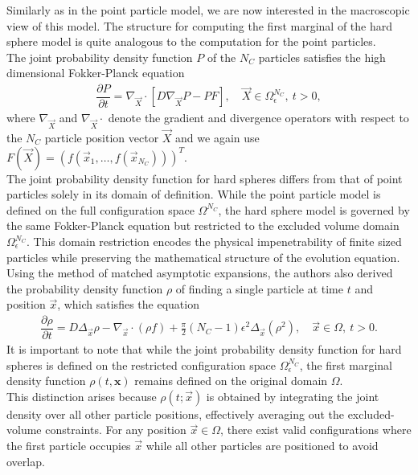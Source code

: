 Similarly as in the point particle model, we are now interested in the macroscopic view of this model. 
The structure for computing the first marginal of the hard sphere model is quite analogous to the computation for the point particles. \\
The joint probability density function $P$ of the $N_C$ particles satisfies the high dimensional Fokker-Planck equation
\begin{align*}
	\dfrac{\partial P}{\partial t} = \nabla_{\vec{X}} \cdot [ D \nabla_{\vec{X}} P - P F], \quad \vec{X} \in \Omega_{\epsilon}^{N_C}, \: t > 0,
\end{align*}
where $\nabla_{\vec{X}}$ and $\nabla_{\vec{X}} \cdot$ denote the gradient and divergence operators with respect to the $N_C$ particle position vector $\vec{X}$ and we again use $F(\vec{X}) = (f(\vec{x}_1, \ldots, f(\vec{x}_{N_C})))^T$. \\
The joint probability density function for hard spheres differs from that of point particles solely in its domain of definition. 
While the point particle model is defined on the full configuration space $\Omega^{N_C}$, the hard sphere model is governed by the same Fokker-Planck equation but restricted to the excluded volume domain $\Omega_{\epsilon}^{N_C}$. 
This domain restriction encodes the physical impenetrability of finite sized particles while preserving the mathematical structure of the evolution equation. \\
Using the method of matched asymptotic expansions, the authors also derived the probability density function $\rho$ of finding a single particle at time $t$ and position $\vec{x}$, which satisfies the equation
\begin{align}
	\dfrac{\partial \rho}{\partial t} = D \Delta_{\vec{x}} \rho - \nabla_{\vec{x}} \cdot (\rho f) + \frac{\pi}{2} (N_C - 1) \epsilon^2 \Delta_{\vec{x}} (\rho^2), \quad \vec{x} \in \Omega, \: t>0 .
	\label{equ:hardsphere}
\end{align}
It is important to note that while the joint probability density function for hard spheres is defined on the restricted configuration space $\Omega_{\epsilon}^{N_C}$, the first marginal density function $\rho(t, \mathbf{x})$ remains defined on the original domain $\Omega$. \\
This distinction arises because $\rho(t; \vec{x})$ is obtained by integrating the joint density over all other particle positions, effectively averaging out the excluded-volume constraints. 
For any position $\vec{x} \in \Omega$, there exist valid configurations where the first particle occupies $\vec{x}$ while all other particles are positioned to avoid overlap. 
